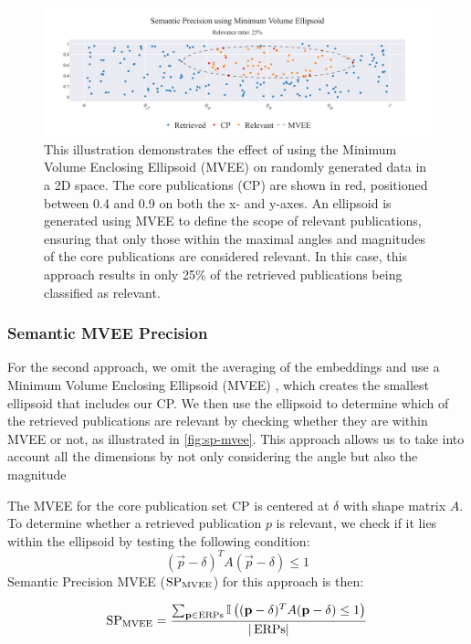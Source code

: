 \begin{figure}[h!]
	\hspace*{-1cm}	
	\includegraphics[scale=0.48]{pics/sp_mvee.pdf}
	\caption[Semantic Precision using MVEEE]{This illustration demonstrates the effect of using the Minimum Volume Enclosing Ellipsoid (MVEE) on randomly generated data in a 2D space. The core publications (CP) are shown in red, positioned between 0.4 and 0.9 on both the x- and y-axes. An ellipsoid is generated using MVEE to define the scope of relevant publications, ensuring that only those within the maximal angles and magnitudes of the core publications are considered relevant. In this case, this approach results in only 25\% of the retrieved publications being classified as relevant.}

	\label{fig:sp-mvee}
\end{figure}

\subsubsection{Semantic MVEE Precision}
For the second approach, we omit the averaging of the embeddings and use a Minimum Volume Enclosing Ellipsoid (MVEE) \autocite{Todd2007}, which creates the smallest ellipsoid that includes our CP. We then use the ellipsoid to determine which of the retrieved publications are relevant by checking whether they are within MVEE or not, as illustrated in \autoref{fig:sp-mvee}. This approach allows us to take into account all the dimensions by not only considering the angle but also the magnitude

The MVEE for the core publication set CP is centered at $\delta$ with shape matrix $A$. To determine whether a retrieved publication $p$ is relevant, we check if it lies within the ellipsoid by testing the following condition:
\[
(\vec{p} - \delta)^T A (\vec{p} - \delta) \leq 1
\]
Semantic Precision MVEE ($\mathop{}\!\mathrm{SP}_\text{{MVEE}}$) for this approach is then:

\begin{equation}\label{eq:sp-mvee}
	\mathop{}\!\mathrm{SP}_{\text{MVEE}} = \frac{\sum_{\mathbf{p} \in \mathop{}\!\mathrm{ERPs}} \mathbb{I} \left( (\mathbf{p} - \delta)^T A (\mathbf{p} - \delta) \leq 1 \right)}{|\mathop{}\!\mathrm{ERPs}|}
\end{equation}

